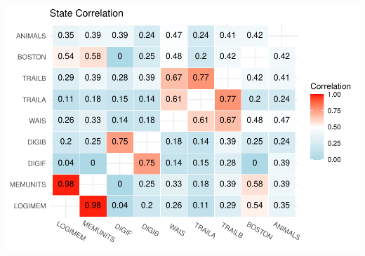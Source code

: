 \documentclass[
]{article}
\begin{document}
\includegraphics{DataAnalysis_files/figure-latex/unnamed-chunk-7-1.pdf}
\end{document}
